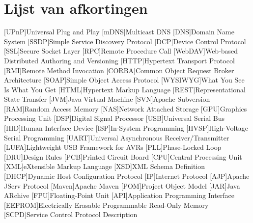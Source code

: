 %
%

\listoffigures


%
%

\lstlistoflistings


%
%

\chapter*{Lijst van afkortingen}

\begin{acronym}[WYSIWYG]	%

[UPnP]{Universal Plug and Play}
[mDNS]{Multicast DNS}
[DNS]{Domain Name System}
[SSDP]{Simple Service Discovery Protocol}
[DCP]{Device Control Protocol}
[SSL]{Secure Socket Layer}
[RPC]{Remote Procedure Call}
[WebDAV]{Web-based Distributed Authoring and Versioning}
[HTTP]{Hypertext Transport Protocol}
[RMI]{Remote Method Invocation}
[CORBA]{Common Object Request Broker Architecture}
[SOAP]{Simple Object Access Protocol}
[WYSIWYG]{What You See Is What You Get}
[HTML]{Hypertext Markup Language}
[REST]{Representational State Transfer}
[JVM]{Java Virtual Machine}
[SVN]{Apache Subversion}
[RAM]{Random Access Memory}
[NAS]{Network Attached Storage}
[GPU]{Graphics Processing Unit}
[DSP]{Digital Signal Processor}
[USB]{Universal Serial Bus}
[HID]{Human Interface Device}
[ISP]{In-System Programming}
[HVSP]{High-Voltage Serial Programming}
[UART]{Universal Asynchronous Receiver/Transmitter}
[LUFA]{Lightweight USB Framework for AVRs}
[PLL]{Phase-Locked Loop}
[DRU]{Design Rules}
[PCB]{Printed Circuit Board}
[CPU]{Central Processing Unit}
[XML]{eXtensible Markup Language}
[XSD]{XML Schema Definition}
[DHCP]{Dynamic Host Configuration Protocol}
[IP]{Internet Protocol}
[AJP]{Apache JServ Protocol}
[Maven]{Apache Maven}
[POM]{Project Object Model}
[JAR]{Java ARchive}
[FPU]{Floating-Point Unit}
[API]{Application Programming Interface}
[EEPROM]{Electrically Erasable Programmable Read-Only Memory}
[SCPD]{Service Control Protocol Description}

\end{acronym}
